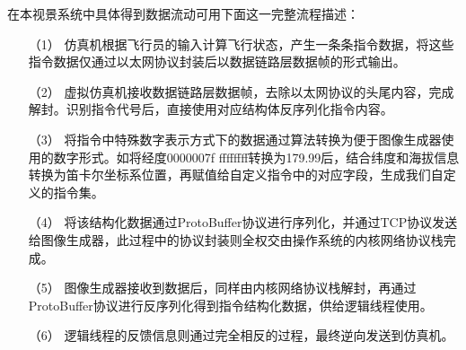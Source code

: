 在本视景系统中具体得到数据流动可用下面这一完整流程描述：
\begin{itemize}
    \item [（1）]
    仿真机根据飞行员的输入计算飞行状态，产生一条条指令数据，将这些指令数据仅通过以太网协议封装后以数据链路层数据帧的形式输出。
    \item [（2）]
    虚拟仿真机接收数据链路层数据帧，去除以太网协议的头尾内容，完成解封。识别指令代号后，直接使用对应结构体反序列化指令内容。
    \item [（3）]
    将指令中特殊数字表示方式下的数据通过算法转换为便于图像生成器使用的数字形式。如将经度0000007f ffffffff转换为179.99后，结合纬度和海拔信息转换为笛卡尔坐标系位置，再赋值给自定义指令中的对应字段，生成我们自定义的指令集。
    \item [（4）]
    将该结构化数据通过ProtoBuffer协议进行序列化，并通过TCP协议发送给图像生成器，此过程中的协议封装则全权交由操作系统的内核网络协议栈完成。
    \item [（5）]
    图像生成器接收到数据后，同样由内核网络协议栈解封，再通过ProtoBuffer协议进行反序列化得到指令结构化数据，供给逻辑线程使用。
    \item [（6）]
    逻辑线程的反馈信息则通过完全相反的过程，最终逆向发送到仿真机。
\end{itemize}


